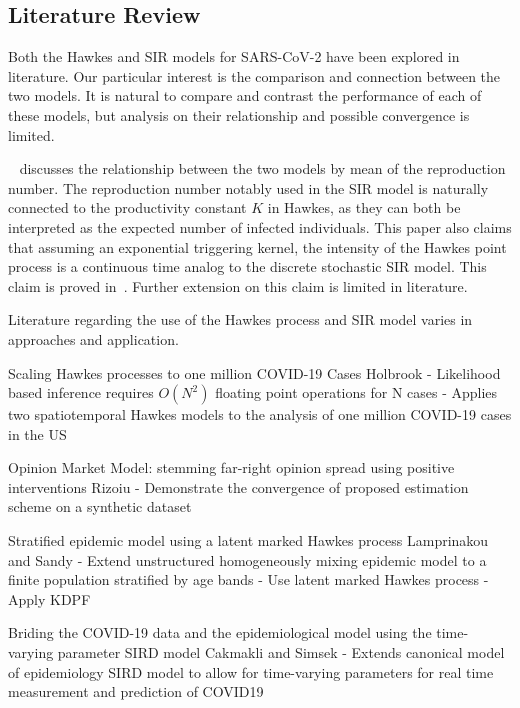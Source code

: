\documentclass[12pt]{article}
\begin{document}
\subsection{Literature Review}

Both the Hawkes and SIR models for SARS-CoV-2 have been explored in literature. Our particular interest is the comparison and connection between the two models. It is natural to compare and contrast the performance of each of these models, but analysis on their relationship and possible convergence is limited. 

~\cite{Kresin2022} discusses the relationship between the two models by mean of the reproduction number. The reproduction number notably used in the SIR model is naturally connected to the productivity constant $K$ in Hawkes, as they can both be interpreted as the expected number of infected individuals. This paper also claims that assuming an exponential triggering kernel, the intensity of the Hawkes point process is a continuous time analog to the discrete stochastic SIR model. This claim is proved in~\cite{Rizoiu2018}. Further extension on this claim is limited in literature. 

Literature regarding the use of the Hawkes process and SIR model varies in approaches and application. 










Scaling Hawkes processes to one million COVID-19 Cases
Holbrook
- Likelihood based inference requires $O(N^2)$ floating point operations for N cases
- Applies two spatiotemporal Hawkes models to the analysis of one million COVID-19 cases in the US


Opinion Market Model: stemming far-right opinion spread using positive interventions
Rizoiu
- Demonstrate the convergence of proposed estimation scheme on a synthetic dataset


Stratified epidemic model using a latent marked Hawkes process
Lamprinakou and Sandy
- Extend unstructured homogeneously mixing epidemic model to a finite population stratified by age bands
- Use latent marked Hawkes process
- Apply KDPF

Briding the COVID-19 data and the epidemiological model using the time-varying parameter SIRD model
Cakmakli and Simsek
- Extends canonical model of epidemiology SIRD model to allow for time-varying parameters for real time measurement and prediction of COVID19
\end{document}
